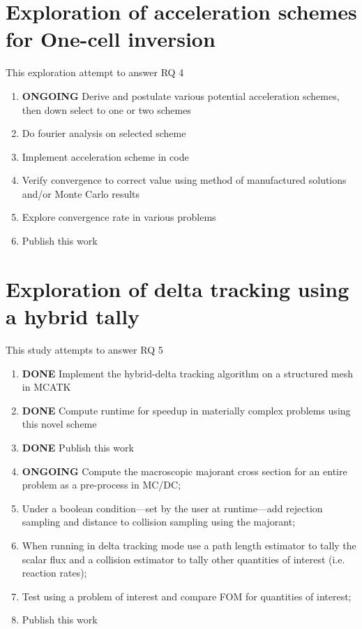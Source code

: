 \section{Exploration of acceleration schemes for One-cell inversion}
This exploration attempt to answer RQ 4
\begin{enumerate}
    \item \textbf{ONGOING} Derive and postulate various potential acceleration schemes, then down select to one or two schemes
    \item Do fourier analysis on selected scheme
    \item Implement acceleration scheme in code
    \item Verify convergence to correct value using method of manufactured solutions and/or Monte Carlo results
    \item Explore convergence rate in various problems
    \item Publish this work
\end{enumerate}

\section{Exploration of delta tracking using a hybrid tally}
This study attempts to answer RQ 5
\begin{enumerate}
    \item \textbf{DONE} Implement the hybrid-delta tracking algorithm on a structured mesh in MCATK
    \item \textbf{DONE} Compute runtime for speedup in materially complex problems using this novel scheme
    \item \textbf{DONE} Publish this work
    \item \textbf{ONGOING} Compute the macroscopic majorant cross section for an entire problem as a pre-process in MC/DC;
    \item Under a boolean condition---set by the user at runtime---add rejection sampling and distance to collision sampling using the majorant;
    \item When running in delta tracking mode use a path length estimator to tally the scalar flux and a collision estimator to tally other quantities of interest (i.e. reaction rates);
    \item Test using a problem of interest and compare FOM for quantities of interest;
    \item Publish this work
\end{enumerate}

